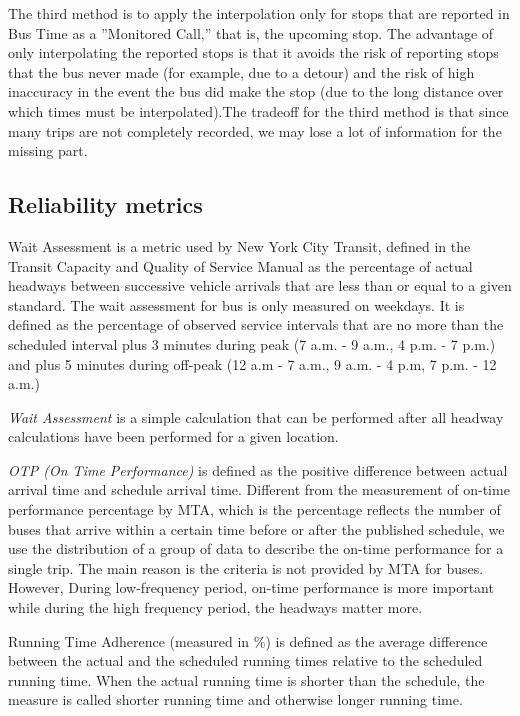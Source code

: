 \documentclass[12pt]{report}
\begin{document}
The third method is to apply the interpolation only for stops that are reported in Bus Time as a ''Monitored Call,'' that is, the upcoming stop. The advantage of only interpolating the reported stops is that it avoids the risk of reporting stops that the bus never made (for example, due to a detour) and the risk of high inaccuracy in the event the bus did make the stop (due to the long distance over which times must be interpolated).The tradeoff for the third method is that since many trips are not completely recorded, we may lose a lot of information for the missing part.

\subsection{Reliability metrics}

Wait Assessment is a metric used by New York City Transit, defined in the Transit Capacity and Quality of Service Manual as the percentage of actual headways between successive vehicle arrivals that are less than or equal to a given standard. The wait assessment for bus is only measured on weekdays. It is defined as the percentage of observed service intervals that are no more than the scheduled interval plus 3 minutes during peak (7 a.m. - 9 a.m., 4 p.m. - 7 p.m.) and plus 5 minutes during off-peak (12 a.m - 7 a.m., 9 a.m. - 4 p.m, 7 p.m. - 12 a.m.)

\textit{Wait Assessment} is a simple calculation that can be performed after all headway calculations have been performed for a given location.

\textit{OTP (On Time Performance)} is defined as the positive difference between actual arrival time and schedule arrival time. Different from the measurement of on-time performance percentage by MTA, which is the percentage reflects the number of buses that arrive within a certain time before or after the published schedule, we use the distribution of a group of data to describe the on-time performance for a single trip. The main reason is the criteria is not provided by MTA for buses. However, During low-frequency period, on-time performance is more important while during the high frequency period, the headways matter more. 

Running Time Adherence (measured in \%) is defined as the average difference between the actual and the scheduled running times relative to the scheduled running time. When the actual running time is shorter than the schedule, the measure is called shorter running time and otherwise longer running time.
\end{document}
